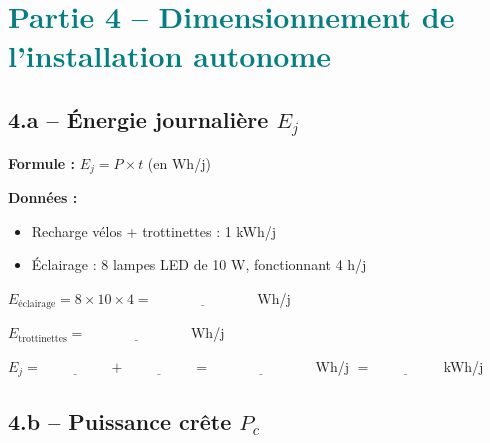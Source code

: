 \documentclass[a4paper, 11pt, oneside]{article}
\begin{document}
\vspace{1.2cm}

\newpage

\section{\textcolor{teal}{Partie 4 -- Dimensionnement de l'installation autonome}}

\subsection*{4.a -- Énergie journalière $E_j$}

\begin{tcolorbox}[colback=orangecol!10, colframe=orangecol]
\textbf{Formule :} $E_j = P \times t$ \quad (en Wh/j)

\vspace{0.3cm}
\textbf{Données :}
\begin{itemize}
  \item Recharge vélos + trottinettes : 1 kWh/j
  \item Éclairage : 8 lampes LED de 10 W, fonctionnant 4 h/j
\end{itemize}

\vspace{0.4cm}
$E_{\text{éclairage}} = 8 \times 10 \times 4 = \underline{\hspace{3cm}}$ Wh/j

$E_{\text{trottinettes}} = \underline{\hspace{3cm}}$ Wh/j

$E_j = \underline{\hspace{2cm}} + \underline{\hspace{2cm}} = \underline{\hspace{3cm}}$ Wh/j $= \underline{\hspace{2cm}}$ kWh/j
\end{tcolorbox}

\vspace{0.8cm}

\subsection*{4.b -- Puissance crête $P_c$}
\end{document}
